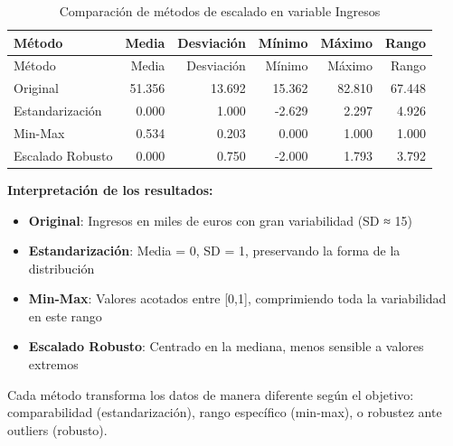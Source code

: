 \documentclass[
  letterpaper,
  DIV=11,
  numbers=noendperiod]{scrreprt}
\providecommand{\tightlist}{%
  \setlength{\itemsep}{0pt}\setlength{\parskip}{0pt}}
\begin{document}
\begin{tcolorbox}
\begin{longtable}[]{@{}lrrrrr@{}}
\caption{Comparación de métodos de escalado en variable
Ingresos}\tabularnewline
\toprule\noalign{}
Método & Media & Desviación & Mínimo & Máximo & Rango \\
\midrule\noalign{}
\endfirsthead
\toprule\noalign{}
Método & Media & Desviación & Mínimo & Máximo & Rango \\
\midrule\noalign{}
\endhead
\bottomrule\noalign{}
\endlastfoot
Original & 51.356 & 13.692 & 15.362 & 82.810 & 67.448 \\
Estandarización & 0.000 & 1.000 & -2.629 & 2.297 & 4.926 \\
Min-Max & 0.534 & 0.203 & 0.000 & 1.000 & 1.000 \\
Escalado Robusto & 0.000 & 0.750 & -2.000 & 1.793 & 3.792 \\
\end{longtable}

\textbf{Interpretación de los resultados:}

\begin{itemize}
\tightlist
\item
  \textbf{Original}: Ingresos en miles de euros con gran variabilidad
  (SD ≈ 15)
\item
  \textbf{Estandarización}: Media = 0, SD = 1, preservando la forma de
  la distribución
\item
  \textbf{Min-Max}: Valores acotados entre {[}0,1{]}, comprimiendo toda
  la variabilidad en este rango
\item
  \textbf{Escalado Robusto}: Centrado en la mediana, menos sensible a
  valores extremos
\end{itemize}

Cada método transforma los datos de manera diferente según el objetivo:
comparabilidad (estandarización), rango específico (min-max), o robustez
ante outliers (robusto).

\end{tcolorbox}
\end{document}
